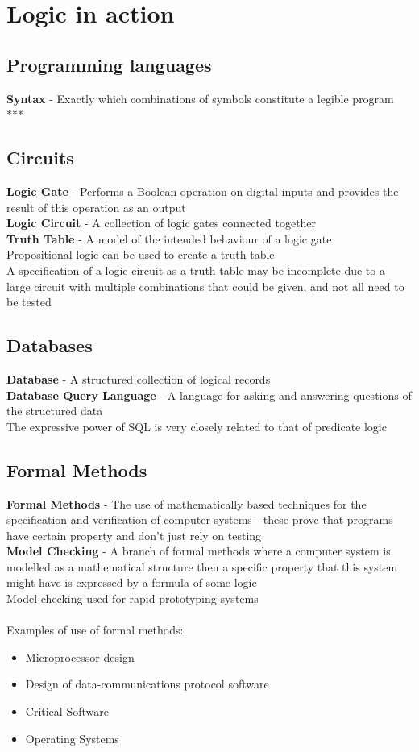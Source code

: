 \documentclass{article}[18pt]
\begin{document}
\section{Logic in  action}
\subsection{Programming languages}
\textbf{Syntax} - Exactly which combinations of symbols constitute a legible program\\
***

\subsection{Circuits}
\textbf{Logic Gate} - Performs a Boolean operation on digital inputs and provides the result of this operation as an output\\
\textbf{Logic Circuit} - A collection of logic gates connected together\\
\textbf{Truth Table} - A model of the intended behaviour of a logic gate
\\
Propositional logic can be used to create a truth table\\
A specification of a logic circuit as a truth table may be incomplete due to a large circuit with multiple combinations that could be given, and not all need to be tested
\subsection{Databases}
\textbf{Database} - A structured collection of logical records\\
\textbf{Database Query Language} - A language for asking and answering questions of the structured data\\
The expressive power of SQL is very closely related to that of predicate logic
\subsection{Formal Methods}
\textbf{Formal Methods} - The use of mathematically based techniques for the specification and verification of computer systems - these prove that programs have certain property and don't just rely on testing\\
\textbf{Model Checking} - A branch of formal methods where a computer system is modelled as a mathematical structure then a specific property that this system might have is expressed by a formula of some logic\\
Model checking used for rapid prototyping systems\\
\\
Examples of use of formal methods:
\begin{itemize}
\item Microprocessor design
\item Design of data-communications protocol software
\item Critical Software
\item Operating Systems
\end{itemize}
\end{document}
